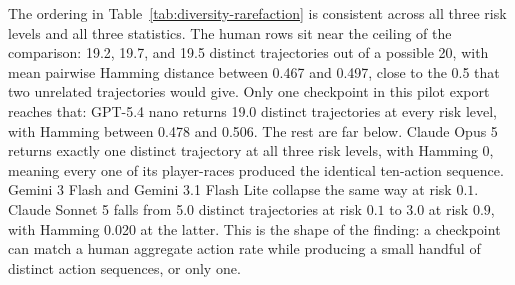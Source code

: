 \documentclass{article}
\begin{document}
The ordering in Table~\ref{tab:diversity-rarefaction} is consistent across all
three risk levels and all three statistics. The human rows sit near the
ceiling of the comparison: 19.2, 19.7, and 19.5 distinct trajectories out of a
possible 20, with mean pairwise Hamming distance between 0.467 and 0.497,
close to the 0.5 that two unrelated trajectories would give. Only one
checkpoint in this pilot export reaches that: GPT-5.4 nano returns 19.0
distinct trajectories at
every risk level, with Hamming between 0.478 and 0.506. The rest are far
below. Claude Opus 5 returns exactly one distinct trajectory at all three risk
levels, with Hamming 0, meaning every one of its player-races produced the
identical ten-action sequence. Gemini 3 Flash and Gemini 3.1 Flash Lite
collapse the same way at risk $0.1$. Claude Sonnet 5 falls from 5.0 distinct
trajectories at risk $0.1$ to 3.0 at risk $0.9$, with Hamming 0.020 at the
latter. This is the shape of the finding: a checkpoint
can match a human aggregate action rate while producing a small handful of
distinct action sequences, or only one.
\end{document}
